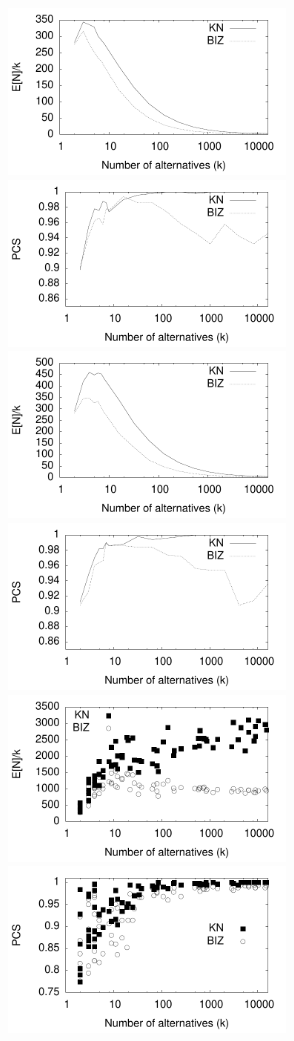 \documentclass[12pt]{article}
\begin{document}
\begin{figure}[tb]
    \includegraphics[width=2.9in]{pdf/FINAL-MDMINCA-Nk} 
    \includegraphics[width=2.9in]{pdf/FINAL-MDMINCA-PCS}
    \includegraphics[width=2.9in]{pdf/FINAL-MDMDECA-Nk} 
    \includegraphics[width=2.9in]{pdf/FINAL-MDMDECA-PCS}
    \includegraphics[width=2.9in]{pdf/FINAL-RPIHETA-Nk} 
    \includegraphics[width=2.9in]{pdf/FINAL-RPIHETA-PCS}


\end{figure}
\end{document}
